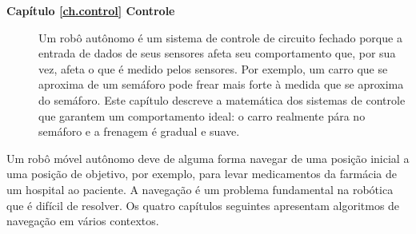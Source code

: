 \begin{description}
\item [\textbf{Capítulo \ref{ch.control} Controle}] Um robô autônomo é um sistema de controle de circuito fechado porque a entrada de dados de seus sensores afeta seu comportamento que, por sua vez, afeta o que é medido pelos sensores. Por exemplo, um carro que se aproxima de um semáforo pode frear mais forte à medida que se aproxima do semáforo. Este capítulo descreve a matemática dos sistemas de controle que garantem um comportamento ideal: o carro realmente pára no semáforo e a frenagem é gradual e suave.
\end{description}

Um robô móvel autônomo deve de alguma forma navegar de uma posição inicial a uma posição de objetivo, por exemplo, para levar medicamentos da farmácia de um hospital ao paciente. A navegação é um problema fundamental na robótica que é difícil de resolver. Os quatro capítulos seguintes apresentam algoritmos de navegação em vários contextos.
